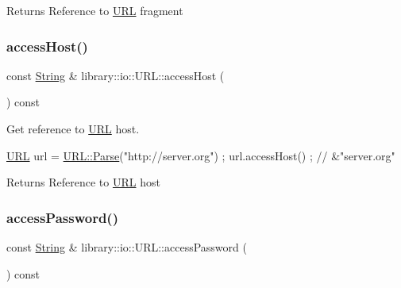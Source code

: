 \begin{DoxyReturn}{Returns}
Reference to \hyperlink{classlibrary_1_1io_1_1_u_r_l}{U\+RL} fragment 
\end{DoxyReturn}
\mbox{\label{classlibrary_1_1io_1_1_u_r_l_a14c7741f6259f124d22551c34a7bb746}} 
\subsubsection{\texorpdfstring{access\+Host()}{accessHost()}}
{\footnotesize\ttfamily const \hyperlink{namespacelibrary_1_1io_a7469b45835a4421045db344d6a5a1f85}{String} \& library\+::io\+::\+U\+R\+L\+::access\+Host (\begin{DoxyParamCaption}{ }\end{DoxyParamCaption}) const}



Get reference to \hyperlink{classlibrary_1_1io_1_1_u_r_l}{U\+RL} host. 


\begin{DoxyCode}
\hyperlink{classlibrary_1_1io_1_1_u_r_l_a7e9c070138a6dbd000ffb10b7cd8a5c4}{URL} url = \hyperlink{classlibrary_1_1io_1_1_u_r_l_a03a589af0787df20428d4d33e26bb2d7}{URL::Parse}(\textcolor{stringliteral}{"http://server.org"}) ;
url.accessHost() ; \textcolor{comment}{// &"server.org"}
\end{DoxyCode}


\begin{DoxyReturn}{Returns}
Reference to \hyperlink{classlibrary_1_1io_1_1_u_r_l}{U\+RL} host 
\end{DoxyReturn}
\mbox{\label{classlibrary_1_1io_1_1_u_r_l_ad5451bf00680a6b6150a525acad12bd7}} 
\subsubsection{\texorpdfstring{access\+Password()}{accessPassword()}}
{\footnotesize\ttfamily const \hyperlink{namespacelibrary_1_1io_a7469b45835a4421045db344d6a5a1f85}{String} \& library\+::io\+::\+U\+R\+L\+::access\+Password (\begin{DoxyParamCaption}{ }\end{DoxyParamCaption}) const}



